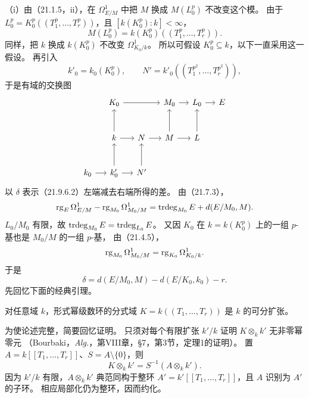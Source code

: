 \eproof
（i）由（21.1.5，ii），在 $\Omega^1_{E/M}$ 中把 $M$ 换成 $M(L_0^p)$ 不改变这个模。
由于 $L_0^p=K_0^p((T_1^p,\ldots,T_r^p))$，且 $[k(K_0^p):k]<\infty$，
\[
 M(L_0^p)=k(K_0^p)((T_1^p,\ldots,T_r^p)).
\]
同样，把 $k$ 换成 $k(K_0^p)$ 不改变 $\Omega^1_{K_0/k}$。
所以可假设 $K_0^p\subseteq k$，以下一直采用这一假设。
再引入
\[
 k'_0=k_0(K_0^p),\qquad N'=k'_0((T_1^{p^2},\ldots,T_r^{p^2})),
\]
于是有域的交换图
\[
\begin{tikzcd}[column sep=small,row sep=large]
 &K_0\arrow[rr]&&M_0\arrow[r]&L_0\arrow[r]&E\\
 &k\arrow[u]\arrow[r]&N\arrow[r]&M\arrow[u]\arrow[r]&L\arrow[u]&\\
 k_0\arrow[r]&k'_0\arrow[u]\arrow[r]&N'\arrow[u]&&&
\end{tikzcd}
\]
以 $\delta$ 表示（21.9.6.2）左端减去右端所得的差。
由（21.7.3），
\[
 \operatorname{rg}_E\Omega^1_{E/M}-\operatorname{rg}_{M_0}\Omega^1_{M_0/M}
 =\operatorname{trdeg}_{M_0}E+d(E/M_0,M).
\]
$L_0/M_0$ 有限，故 $\operatorname{trdeg}_{M_0}E=\operatorname{trdeg}_{L_0}E$。
又因 $K_0$ 在 $k=k(K_0^p)$ 上的一组 $p$-基也是 $M_0/M$ 的一组 $p$-基，
由（21.4.5），
\[
 \operatorname{rg}_{M_0}\Omega^1_{M_0/M}=\operatorname{rg}_{K_0}\Omega^1_{K_0/k}.
\]
于是
\begin{equation}
 \delta=d(E/M_0,M)-d(E/K_0,k_0)-r.
 \tag{21.9.6.3}
\end{equation}
先回忆下面的经典引理。

对任意域 $k$，形式幂级数环的分式域
$K=k((T_1,\ldots,T_r))$ 是 $k$ 的可分扩张。

\eproof
为使论述完整，简要回忆证明。
只须对每个有限扩张 $k'/k$ 证明 $K\otimes_kk'$ 无非零幂零元
（Bourbaki，\textit{Alg.}，第VIII章，§7，第3节，定理1的证明）。
置 $A=k[[T_1,\ldots,T_r]]$、$S=A\setminus\{0\}$，则
\[
 K\otimes_kk'=S^{-1}(A\otimes_kk').
\]
因为 $k'/k$ 有限，$A\otimes_kk'$ 典范同构于整环
$A'=k'[[T_1,\ldots,T_r]]$，且 $A$ 识别为 $A'$ 的子环。
相应局部化仍为整环，因而约化。
\finishproof

